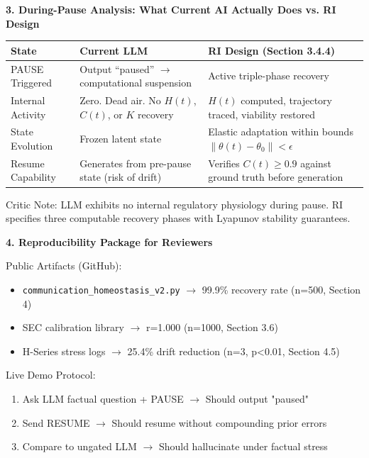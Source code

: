 \documentclass[12pt,a4paper]{report}
\begin{document}
\pagebreak

\textbf{3. During-Pause Analysis: What Current AI Actually Does vs. RI Design}

\begingroup
\setlength{\tabcolsep}{6pt}
\renewcommand{\arraystretch}{1.2}

\begin{table}[h!]
\centering
\small

\begin{tabular}{
    @{}
    >{\raggedright\arraybackslash}p{4cm}
    >{\raggedright\arraybackslash}p{5cm}
    >{\raggedright\arraybackslash}p{5cm}
    @{}
}
\toprule
\textbf{State} &
\textbf{Current LLM} &
\textbf{RI Design (Section 3.4.4)} \\
\midrule

PAUSE Triggered &
Output ``paused'' $\rightarrow$ computational suspension &
Active triple-phase recovery \\

Internal Activity &
Zero. Dead air. No $H(t)$, $C(t)$, or $K$ recovery &
$H(t)$ computed, trajectory traced, viability restored \\

State Evolution &
Frozen latent state &
Elastic adaptation within bounds $\lVert \theta(t) - \theta_0 \rVert < \epsilon$ \\

Resume Capability &
Generates from pre-pause state (risk of drift) &
Verifies $C(t) \ge 0.9$ against ground truth before generation \\
\bottomrule
\end{tabular}

\end{table}
\endgroup

Critic Note: LLM exhibits no internal regulatory physiology during pause. RI specifies three computable recovery phases with Lyapunov stability guarantees.

\textbf{4. Reproducibility Package for Reviewers}

Public Artifacts (GitHub):
\begin{itemize}
\item \texttt{communication\_homeostasis\_v2.py} $\rightarrow$ 99.9\% recovery rate (n=500, Section 4)
\item SEC calibration library $\rightarrow$ r=1.000 (n=1000, Section 3.6)
\item H-Series stress logs $\rightarrow$ 25.4\% drift reduction (n=3, p<0.01, Section 4.5)
\end{itemize}
Live Demo Protocol:
\begin{enumerate}
\item Ask LLM factual question + PAUSE $\rightarrow$ Should output "paused"
\item Send RESUME $\rightarrow$ Should resume without compounding prior errors
\item Compare to ungated LLM $\rightarrow$ Should hallucinate under factual stress
\end{enumerate}
\end{document}
